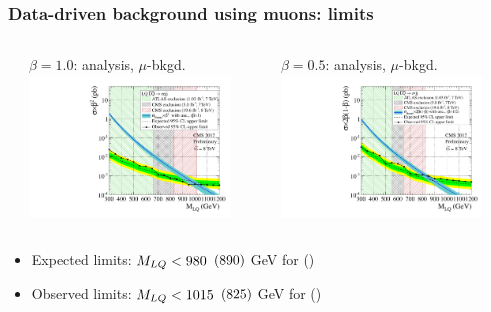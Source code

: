 \documentclass[bigger]{beamer}
\begin{document}
\begin{frame}
\frametitle{Data-driven background using muons: limits}
\label{sec-1-6-6}
\begin{columns} %
\label{sec-1-6-6-1}
\begin{column}{0.5\textwidth}
\label{sec-1-6-6-1-1}

\centering
$\beta = 1.0$: \eejj analysis, $\mu$-bkgd.
\includegraphics[width=0.875\textwidth]{fig/limits/BR_Sigma_EE_muonBackground.pdf}
\end{column}
\begin{column}{0.5\textwidth}
\label{sec-1-6-6-1-2}

\centering
$\beta = 0.5$: \enujj analysis, $\mu$-bkgd.
\includegraphics[width=0.875\textwidth]{fig/limits/BR_Sigma_ENu_muonBackground.pdf}
\end{column}
\end{columns}
\label{sec-1-6-6-2}

\begin{itemize}
\item Expected limits: $M_{LQ} < 980$ $(890)$ GeV for \eejj (\enujj)
\item Observed limits: $M_{LQ} < 1015$ $(825)$ GeV for \eejj (\enujj)
\end{itemize}
\end{frame}
\end{document}
